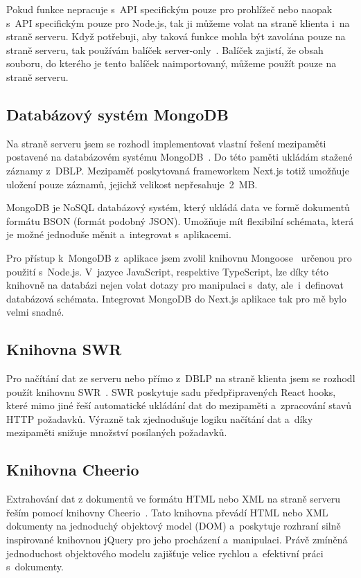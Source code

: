\documentclass[
  biblatex,
  sourcecodes,
  glossaries,
  index
]{kidiplom}
\begin{document}
Pokud funkce nepracuje s~API specifickým pouze pro prohlížeč nebo naopak s~API specifickým pouze pro Node.js, tak ji můžeme volat na straně klienta i~na straně serveru. Když potřebuji, aby taková funkce mohla být zavolána pouze na straně serveru, tak používám balíček server-only~\cite{t17}. Balíček zajistí, že obsah souboru, do kterého je tento balíček naimportovaný, můžeme použít pouze na straně serveru.

\subsection{Databázový systém MongoDB}

Na straně serveru jsem se rozhodl implementovat vlastní řešení mezipaměti postavené na databázovém systému MongoDB~\cite{t18}. Do této paměti ukládám stažené záznamy z~DBLP. Mezipaměť poskytovaná frameworkem Next.js totiž umožňuje uložení pouze záznamů, jejichž velikost nepřesahuje~2~MB.

MongoDB je NoSQL databázový systém, který ukládá data ve formě dokumentů formátu BSON (formát podobný JSON). Umožňuje mít flexibilní schémata, která je možné jednoduše měnit a~integrovat s~aplikacemi.

Pro přístup k~MongoDB z~aplikace jsem zvolil knihovnu Mongoose~\cite{t19} určenou pro použití s~Node.js. V~jazyce JavaScript, respektive TypeScript, lze díky této knihovně na databázi nejen volat dotazy pro manipulaci s~daty, ale~i~definovat databázová schémata. Integrovat MongoDB do Next.js aplikace tak pro mě bylo velmi snadné.

\subsection{Knihovna SWR}

Pro načítání dat ze serveru nebo přímo z~DBLP na straně klienta jsem se rozhodl použít knihovnu SWR~\cite{t20}. SWR poskytuje sadu předpřipravených React hooks, které mimo jiné řeší automatické ukládání dat do mezipaměti a~zpracování stavů HTTP požadavků. Výrazně tak zjednodušuje logiku načítání dat a~díky mezipaměti snižuje množství posílaných požadavků.

\subsection{Knihovna Cheerio}

Extrahování dat z dokumentů ve formátu HTML nebo XML na straně serveru řeším pomocí knihovny Cheerio~\cite{t21}. Tato knihovna převádí HTML nebo XML dokumenty na jednoduchý objektový model (DOM) a~poskytuje rozhraní silně inspirované knihovnou jQuery pro jeho procházení a~manipulaci. Právě zmíněná jednoduchost objektového modelu zajišťuje velice rychlou a~efektivní práci s~dokumenty.
\end{document}
